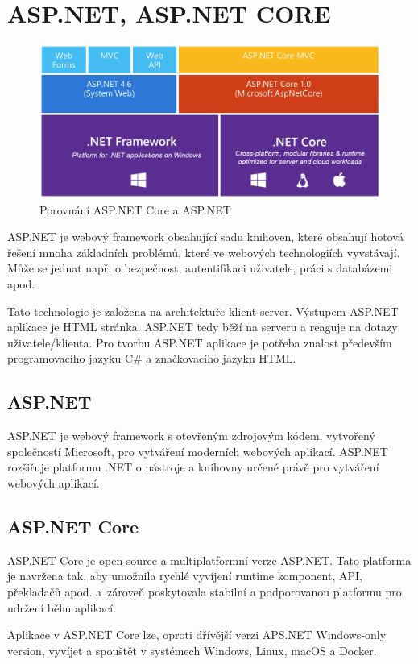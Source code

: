 \documentclass[a4paper, 12pt]{report}
\begin{document}
	\section{ASP.NET, ASP.NET CORE}
	\begin{figure}[h!]
		\includegraphics[width=\textwidth]{aspnetcore_aspnet}
		\caption{Porovnání ASP.NET Core a ASP.NET \cite{ASPNETCORE_ASPNET}}
		\label{ASP.NET Core a ASP.NET}
	\end{figure}
	ASP.NET je webový framework obsahující sadu knihoven, které obsahují hotová řešení mnoha základních problémů, které ve webových technologiích vyvstávají. Může se jednat např. o bezpečnost, autentifikaci uživatele, práci s databázemi apod.\par
	Tato technologie je založena na architektuře klient-server. Výstupem ASP.NET aplikace je HTML stránka. ASP.NET tedy běží na serveru a reaguje na dotazy uživatele/klienta. Pro tvorbu ASP.NET aplikace je potřeba znalost především programovacího jazyku C\# a značkovacího jazyku HTML.\cite{ASP.NET_Lekce1}

	\subsection{ASP.NET}
    ASP.NET je webový framework s otevřeným zdrojovým kódem, vytvořený společností Microsoft, pro vytváření moderních webových aplikací. ASP.NET rozšiřuje platformu .NET o nástroje a knihovny určené právě pro vytváření webových aplikací.\cite{ASP.NET}

	\subsection{ASP.NET Core}
    ASP.NET Core je open-source a multiplatformní verze ASP.NET. Tato platforma je navržena tak, aby umožnila rychlé vyvíjení runtime komponent, API, překladačů apod. a~zároveň poskytovala stabilní a podporovanou platformu pro udržení běhu aplikací.\par
	Aplikace v ASP.NET Core lze, oproti dřívější verzi APS.NET Windows-only version, vyvíjet a spouštět v systémech Windows, Linux, macOS a Docker.\cite{ASP.NET_Core}
\end{document}
